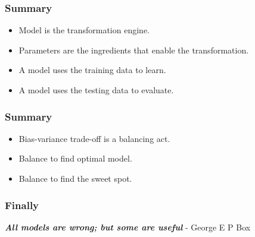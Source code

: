 \begin{frame}[fragile]\frametitle{Summary}
\begin{itemize}
\item Model is the transformation engine. 
\item Parameters are the ingredients that enable the transformation.
\item A model uses the training data to learn.
\item A model uses the testing data to evaluate.
\end{itemize}
\end{frame}

\begin{frame}[fragile]\frametitle{Summary}
\begin{itemize}
\item Bias-variance trade-off is a balancing act. 
\item Balance to find optimal model. 
\item Balance to find the sweet spot.
\end{itemize}
\end{frame}

%


\begin{frame}[fragile]\frametitle{Finally}
\vspace{0.8in}
{\em \bf All models are wrong; but some are useful}
- George E P Box
\end{frame}


